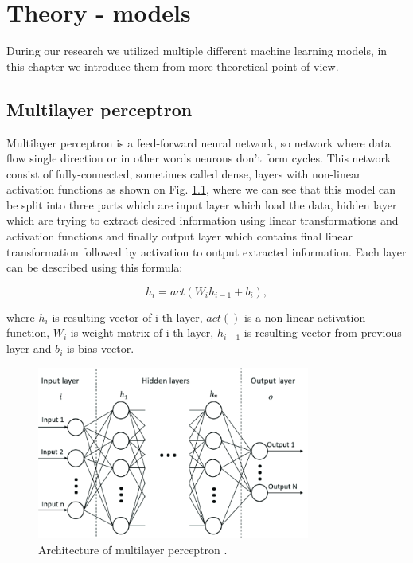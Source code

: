 
\chapter{Theory - models}
\label{chap:thoery}

During our research we utilized multiple different machine learning models, in this chapter we introduce them from more theoretical point of view.

\section{Multilayer perceptron}
\label{MLP}

Multilayer perceptron is a feed-forward neural network, so network where data flow single direction or in other words neurons don't form cycles. This network consist of fully-connected, sometimes called dense, layers with non-linear activation functions as shown on Fig. \ref{fig:mlp}, where we can see that this model can be split into three parts which are input layer which load the data, hidden layer which are trying to extract desired information using linear transformations and activation functions and finally output layer which contains final linear transformation followed by activation to output extracted information. Each layer can be described using this formula:

\begin{equation}
	\label{eqn:mlp}
	h_i = act(W_i h_{i-1} + b_i),
\end{equation}

where $h_i$ is resulting vector of i-th layer, $act()$ is a non-linear activation function, $W_i$ is weight matrix of i-th layer, $h_{i-1}$ is resulting vector from previous layer and $b_i$ is bias vector.

\begin{figure}[!h]
	\centering
	
	\includegraphics[width=0.8\textwidth]{images/MLP_arch.png}
	
	\caption{Architecture of multilayer perceptron \cite{MLParch}.}
	\label{fig:mlp}
\end{figure} 

